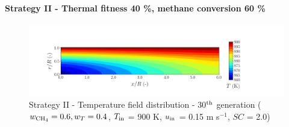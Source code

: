 \documentclass[preprint,12pt]{elsarticle}
\begin{document}


\clearpage



\paragraph{Strategy II - Thermal fitness 40 \%, methane conversion 60 \%} 
\label{subsec:S26040}

%

\begin{figure}[h!]
\centering
\includegraphics[width=150mm]{results/5Eq/60C_40T/GEN30-TFIELD.png}
\caption{\label{fig:5RES6040G30-TField} Strategy II - Temperature field distribution - 30$^{\rm{th}}$ generation ($w_{\rm{CH_4}} = 0.6, w_T = 0.4$, $T_{\rm{in}}$ = 900 K, $u_{\rm{in}}$ = 0.15 m s$^{-1}$, $SC$ = 2.0)}
\end{figure}


%
\end{document}
